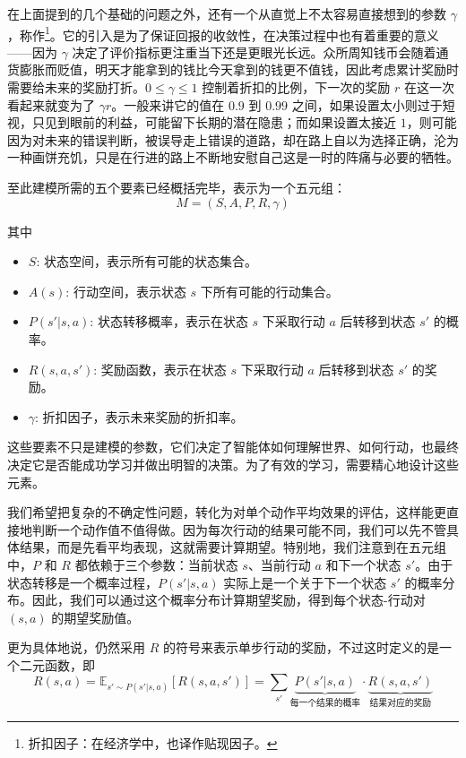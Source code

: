在上面提到的几个基础的问题之外，还有一个从直觉上不太容易直接想到的参数 $\gamma$，称作\footnote{折扣因子：在经济学中，也译作贴现因子。}。它的引入是为了保证回报的收敛性，在决策过程中也有着重要的意义——因为 $\gamma$ 决定了评价指标更注重当下还是更眼光长远。众所周知钱币会随着通货膨胀而贬值，明天才能拿到的钱比今天拿到的钱更不值钱，因此考虑累计奖励时需要给未来的奖励打折。$0 \le \gamma \le 1$ 控制着折扣的比例，下一次的奖励 $r$ 在这一次看起来就变为了 $\gamma r$。一般来讲它的值在 $0.9$ 到 $0.99$ 之间，如果设置太小则过于短视，只见到眼前的利益，可能留下长期的潜在隐患；而如果设置太接近 $1$，则可能因为对未来的错误判断，被误导走上错误的道路，却在路上自以为选择正确，沦为一种画饼充饥，只是在行进的路上不断地安慰自己这是一时的阵痛与必要的牺牲。

至此建模所需的五个要素已经概括完毕，表示为一个五元组：
\[
    M = (S, A, P, R, \gamma) 
\]

其中
\begin{itemize}
    \item $S$: 状态空间，表示所有可能的状态集合。
    \item $A(s)$: 行动空间，表示状态 $s$ 下所有可能的行动集合。
    \item $P(s' | s, a)$: 状态转移概率，表示在状态 $s$ 下采取行动 $a$ 后转移到状态 $s'$ 的概率。
    \item $R(s, a, s')$: 奖励函数，表示在状态 $s$ 下采取行动 $a$ 后转移到状态 $s'$ 的奖励。
    \item $\gamma$: 折扣因子，表示未来奖励的折扣率。
\end{itemize}

这些要素不只是建模的参数，它们决定了智能体如何理解世界、如何行动，也最终决定它是否能成功学习并做出明智的决策。为了有效的学习，需要精心地设计这些元素。

我们希望把复杂的不确定性问题，转化为对单个动作平均效果的评估，这样能更直接地判断一个动作值不值得做。因为每次行动的结果可能不同，我们可以先不管具体结果，而是先看平均表现，这就需要计算期望。特别地，我们注意到在五元组中，$P$ 和 $R$ 都依赖于三个参数：当前状态 $s$、当前行动 $a$ 和下一个状态 $s'$。由于状态转移是一个概率过程，$P(s' | s, a)$ 实际上是一个关于下一个状态 $s'$ 的概率分布。因此，我们可以通过这个概率分布计算期望奖励，得到每个状态-行动对 $(s, a)$ 的期望奖励值。

更为具体地说，仍然采用 $R$ 的符号来表示单步行动的奖励，不过这时定义的是一个二元函数，即
\[
    R(s, a) = \mathbb{E}_{s' \sim P(s' | s, a)}[R(s, a, s')] = \sum_{s'} \underset{\text{每一个结果的概率}}{\underbrace{P(s' | s, a)}} \cdot \underset{\text{结果对应的奖励}}{\underbrace{R(s, a, s')}}
\]

